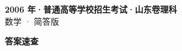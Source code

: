 \documentclass[zihao=-4, a4paper]{ctexart}
\begin{document}
\begin{center}
  {\Large\bfseries 2006 年·普通高等学校招生考试·山东卷理科}\\[4pt]
  {\large 数学 · 简答版}
\end{center}
\medskip
{}

\clearpage
{}
\begin{center}{\Large\bfseries 答案速查}\end{center}
\medskip

\end{document}
